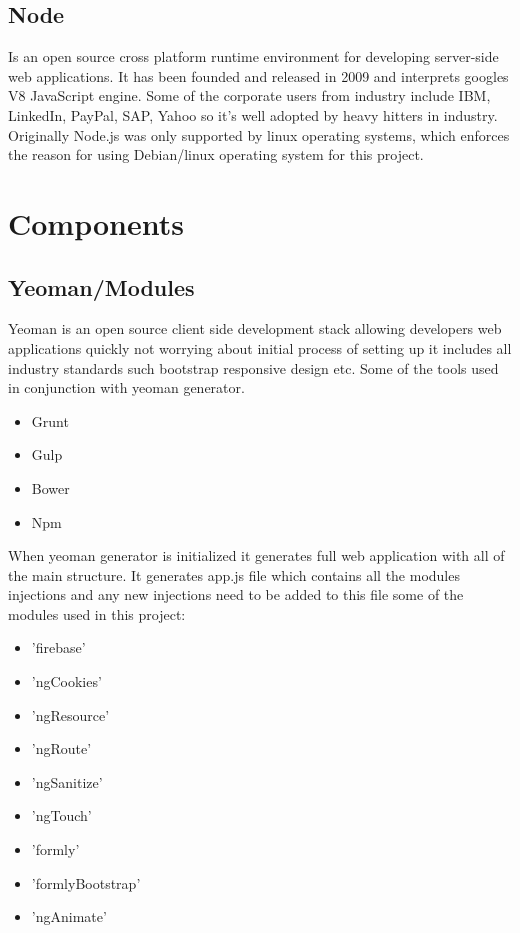 \subsection{Node}
\bigbreak
Is an open source cross platform runtime environment for developing server-side web applications. It has been founded and released in 2009 and interprets googles V8 JavaScript engine. Some of the corporate users from industry include IBM, LinkedIn, PayPal, SAP, Yahoo so it’s well adopted by heavy hitters in industry. Originally Node.js was only supported by linux operating systems, which enforces the reason for using Debian/linux operating system for this project.


\section{Components}
\subsection{Yeoman/Modules}
\bigbreak
Yeoman is an open source client side development stack allowing developers web applications quickly not worrying about initial process of setting up it includes all industry standards such bootstrap responsive design etc. Some of the tools used in conjunction with yeoman generator.

\begin{itemize}

	\item Grunt 
	\item Gulp
	\item Bower
	\item Npm

\end{itemize}

When yeoman generator is initialized it generates full web application with all of the main structure. 
It generates app.js file which contains all the modules injections and any new injections need to be added to this file some of the modules used in this project:

\begin{itemize}
	
	\item 'firebase' 
	\item 'ngCookies'
	\item 'ngResource'
	\item 'ngRoute'
	\item 'ngSanitize' 
	\item 'ngTouch'
	\item 'formly'
	\item 'formlyBootstrap'
	\item 'ngAnimate'
	
\end{itemize}
\bigbreak

